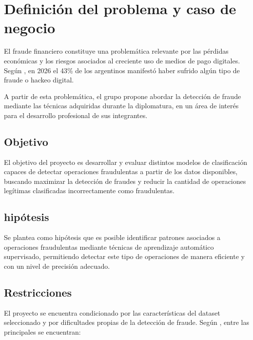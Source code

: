 
\section{Definición del problema y caso de negocio}

El fraude financiero constituye una problemática relevante por las pérdidas económicas y los riesgos asociados al creciente uso de medios de pago digitales. Según \textcite{causa}, en 2026 el 43\% de los argentinos manifestó haber sufrido algún tipo de fraude o hackeo digital.

A partir de esta problemática, el grupo propone abordar la detección de fraude mediante las técnicas adquiridas durante la diplomatura, en un área de interés para el desarrollo profesional de sus integrantes.

\subsection{Objetivo}

El objetivo del proyecto es desarrollar y evaluar distintos modelos de clasificación capaces de detectar operaciones fraudulentas a partir de los datos disponibles, buscando maximizar la detección de fraudes y reducir la cantidad de operaciones legítimas clasificadas incorrectamente como fraudulentas.

\subsection{hipótesis}

Se plantea como hipótesis que es posible identificar patrones asociados a operaciones fraudulentas mediante técnicas de aprendizaje automático supervisado, permitiendo detectar este tipo de operaciones de manera eficiente y con un nivel de precisión adecuado.

\subsection{Restricciones}

El proyecto se encuentra condicionado por las características del dataset seleccionado y por dificultades propias de la detección de fraude. Según \textcite[sección 4.3]{leborgne2022fraud}, entre las principales se encuentran:

